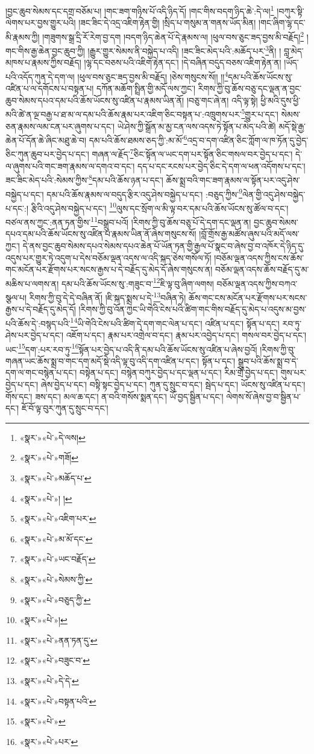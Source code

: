 །བྱང་ཆུབ་སེམས་དང་དགྲ་བཅོམ་པ། །གང་ཟག་གཉིས་པོ་འདི་ཉིད་དོ། །གང་གིས་བདག་ཉིད་ཆེ་:དེ་ལ།\footnote{«སྣར་»«པེ་»དེ་ལས།} །བཀུར་སྟི་ལེགས་པར་བྱས་གྱུར་པའི། །ཟང་ཟིང་དེ་འདྲ་འཇིག་རྟེན་གྱི། །སྲིད་པ་གསུམ་ན་གནས་ཡོད་མིན། །གང་ཞིག་ལྷ་དང་མི་རྣམས་ཀྱི། །གཟུགས་སྒྲ་དྲི་རོ་རེག་བྱ་དག །བདག་ཉིད་ཆེན་པོ་དེ་རྣམས་ལ། །ཕུལ་བས་ཅུང་ཟད་བྱས་མི་བརྗོད།\footnote{«སྣར་»«པེ་»གཟོ།} །གང་གིས་རྒྱ་ཆེན་བྱང་ཆུབ་ཀྱི། །རྒྱུར་གྱུར་སེམས་ནི་བསྐྱེད་པ་འདི། །ཟང་ཟིང་མེད་པའི་:མཆོད་པར་\footnote{«སྣར་»«པེ་»མཆོད་པ་}ནི། །
བླ་མེད་མཁས་པ་རྣམས་ཀྱིས་བརྗོད། །ལྷ་དང་བཅས་པའི་འཇིག་རྟེན་དང་། །དེ་བཞིན་བདུད་བཅས་འཇིག་རྟེན་ན། །ཡོད་པའི་འདོད་ཀུན་དེ་དག་ལ། །ཕུལ་བས་ཅུང་ཟད་བྱས་མི་བརྗོད། །ཅེས་གསུངས་སོ།། །།\footnote{«སྣར་»«པེ་»། །}དམ་པའི་ཆོས་ཡོངས་སུ་འཛིན་པ་ལ་དགོངས་པ་བསྟན་པ། དཀོན་མཆོག་སྤྲིན་གྱི་མདོ་ལས་ཀྱང་། རིགས་ཀྱི་བུ་ཆོས་བཅུ་དང་ལྡན་ན་བྱང་ཆུབ་སེམས་དཔའ་དམ་པའི་ཆོས་ཡོངས་སུ་འཛིན་པ་རྣམས་ཡིན་ནོ། །བཅུ་གང་ཞེ་ན། འདི་ལྟ་སྟེ། ཕྱི་མའི་དུས་ཕྱི་མའི་ཚེ་ན་ལྔ་བརྒྱ་པ་ཐ་མ་ལ་དམ་པའི་ཆོས་རྣམ་པར་འཇིག་ཅིང་བསྟན་པ་:འཁྲུགས་པར་\footnote{«སྣར་»«པེ་»འཇིག་པར་}གྱུར་པ་དང་། སེམས་ཅན་རྣམས་ལམ་ངན་པར་ཞུགས་པ་དང་། ཡེ་ཤེས་ཀྱི་སྒྲོན་མ་མྱ་ངན་ལས་འདས་ཏེ་སྟོན་པ་མེད་པའི་ཚེ། མདོ་སྡེ་རྒྱ་ཆེན་པོ་དོན་ཆེ་ཞིང་མཐུ་ཆེ་བ། དམ་པའི་ཆོས་ཐམས་ཅད་ཀྱི་:མ་མོ་\footnote{«སྣར་»«པེ་»མ་མོ་དང་}འདྲ་བ་དག་འཛིན་ཅིང་ཀློག་ལ་ཁ་ཏོན་དུ་བྱེད་ཅིང་ཀུན་ཆུབ་པར་བྱེད་པ་དང་། གཞན་ལ་རྗོད་\footnote{«སྣར་»«པེ་»ཡང་བརྗོད་}ཅིང་སྟོན་ལ་ཡང་དག་པར་སྟོན་ཅིང་གསལ་བར་བྱེད་པ་དང་། དེ་ལ་ཞུགས་པའི་གང་ཟག་རྣམས་ལ་དགའ་བ་དང་། དད་པ་དང་རངས་པར་བྱེད་ཅིང་དེ་དག་ལ་ཕན་འདོགས་པ་དང་། ཟང་ཟིང་མེད་པའི་:སེམས་ཀྱིས་\footnote{«སྣར་»«པེ་»སེམས་ཀྱི་}དམ་པའི་ཆོས་ཉན་པ་དང་། ཆོས་སྨྲ་བའི་གང་ཟག་རྣམས་ལ་སྟོན་པར་འདུ་ཤེས་བསྐྱེད་པ་དང་། དམ་པའི་ཆོས་རྣམས་ལ་བདུད་རྩིར་འདུ་ཤེས་བསྐྱེད་པ་དང་། :བཅུད་ཀྱིས་\footnote{«སྣར་»«པེ་»བཅུད་ཀྱི་}ལེན་གྱི་འདུ་ཤེས་བསྐྱེད་པ་དང་:། རྩིའི་འདུ་ཤེས་བསྐྱེད་པ་དང་། \footnote{«སྣར་»«པེ་»།  }ལུས་དང་སྲོག་ལ་མི་ལྟ་བར་དམ་པའི་ཆོས་ཡོངས་སུ་ཚོལ་བ་དང་། བཙལ་ནས་ཀྱང་:ནན་ཏན་གྱིས་\footnote{«སྣར་»«པེ་»ནན་ཏན་དུ་}བསྒྲུབ་པའོ། །རིགས་ཀྱི་བུ་ཆོས་བཅུ་པོ་དེ་དག་དང་ལྡན་ན། བྱང་ཆུབ་སེམས་དཔའ་དམ་པའི་ཆོས་ཡོངས་སུ་འཛིན་པ་རྣམས་ཡིན་ནོ་ཞེས་གསུངས་སོ། །བློ་གྲོས་རྒྱ་མཚོས་ཞུས་པའི་མདོ་ལས་ཀྱང་། དེ་ནས་བྱང་ཆུབ་སེམས་དཔའ་སེམས་དཔའ་ཆེན་པོ་ཡོན་ཏན་གྱི་རྒྱལ་པོ་སྣང་བ་ཞེས་བྱ་བ་འཁོར་དེ་ཉིད་དུ་འདུས་པར་གྱུར་ཏེ་འདུག་པ་དེས་བཅོམ་ལྡན་འདས་ལ་འདི་སྐད་ཅེས་གསོལ་ཏོ། །བཅོམ་ལྡན་འདས་ཀྱིས་ངས་ཆོས་གང་མངོན་པར་རྫོགས་པར་སངས་རྒྱས་པ་དེ་བརྗོད་དུ་མེད་དོ་ཞེས་གསུངས་ན། བཅོམ་ལྡན་འདས་ཆོས་བརྗོད་དུ་མ་མཆིས་པ་ལགས་ན། དམ་པའི་ཆོས་ཡོངས་སུ་:གཟུང་བ་\footnote{«སྣར་»«པེ་»བཟུང་བ་}ཇི་ལྟ་བུ་ཞིག་ལགས། བཅོམ་ལྡན་འདས་ཀྱིས་བཀའ་སྩལ་པ། རིགས་ཀྱི་བུ་དེ་དེ་བཞིན་ནོ། །ཇི་སྐད་སྨྲས་པ་དེ་\footnote{«སྣར་»«པེ་»དེ་དེ་}བཞིན་ཏེ། ཆོས་གང་ངས་མངོན་པར་རྫོགས་པར་སངས་རྒྱས་པ་དེ་བརྗོད་དུ་མེད་དོ། །རིགས་ཀྱི་བུ་འོན་ཀྱང་ཡི་གེའི་ངེས་པའི་ཚིག་གང་གིས་བརྗོད་དུ་མེད་པ་འདུས་མ་བྱས་པའི་ཆོས་དེ་:བསྙད་པའི་\footnote{«སྣར་»«པེ་»བསྟན་པའི་}ཡི་གེའི་ངེས་པའི་ཚིག་དེ་དག་གང་ལེན་པ་དང་། འཛིན་པ་དང་། སྟོན་པ་དང་། རབ་ཏུ་ཤེས་པར་བྱེད་པ་དང་། འཇོག་པ་དང་། རྣམ་པར་འགྲེལ་བ་དང་། རྣམ་པར་འབྱེད་པ་དང་། གསལ་བར་བྱེད་པ་དང་། ཡང་\footnote{«སྣར་»«པེ་»}དག་:པར་རབ་ཏུ་\footnote{«སྣར་»«པེ་»པར་}སྟོན་པར་བྱེད་པ་འདི་ནི་དམ་པའི་ཆོས་ཡོངས་སུ་འཛིན་པ་ཞེས་བྱའོ། །རིགས་ཀྱི་བུ་གཞན་ཡང་ཆོས་སྨྲ་བ་གང་དག་མདོ་སྡེ་འདི་ལྟ་བུ་འདི་དག་འཛིན་པ་དང་། སྟོན་པ་དང་། སྒྲུབ་པའི་ཆོས་སྨྲ་བ་དེ་དག་ལ་གང་བསྙེན་པ་དང་། བསྟེན་པ་དང་། བསྙེན་བཀུར་བྱེད་པ་དང་ལྡན་པ་དང་། རིམ་གྲོ་བྱེད་པ་དང་། གུས་པར་བྱེད་པ་དང་། ཞེས་བྱེད་པ་དང་། བསྟི་སྟང་བྱེད་པ་དང་། ཀུན་དུ་སྲུང་བ་དང་། སྦེད་པ་དང་། ཡོངས་སུ་འཛིན་པ་དང་། གོས་དང་། ཟས་དང་། མལ་ཆ་དང་། ན་བའི་གསོས་སྨན་དང་། ཡོ་བྱད་སྦྱིན་པ་དང་། ལེགས་སོ་ཞེས་བྱ་བ་སྦྱིན་པ་དང་། ཇོ་བོ་ལྟ་བུར་ཀུན་དུ་སྲུང་བ་དང་། 
